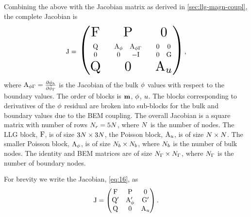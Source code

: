 \newcommand{\Amm}{\Am_\phim}
\newcommand{\Amu}{\Am_\phione}
\newcommand{\zm}{0}
\newcommand{\Abound}{\Am_{\phim\boundd}}

\newcommand{\scalemath}[2]{\scalebox{#1}{\begin{math} {#2} \end{math}}}

\newcommand{\Aprime}{\scalemath{0.5}{\begin{matrix} \Amm     & \Abound \\ \zm      & -\Idm \end{matrix}}}
\newcommand{\Gprime}{\scalemath{0.5}{\begin{matrix} \zm  & \zm \\ \zm  & \bm \end{matrix}}}
\newcommand{\Qprime}{\scalemath{0.5}{\begin{matrix} \Qm \\ \zm \end{matrix}}}


Combining the above with the Jacobian matrix as derived in \cref{sec:llg-magn-coupl}, the complete Jacobian is
\begin{equation}
  \Jm =
  \scalemath{2}{
    \begin{pmatrix}
      \Fm        & \Pm     &  \zm \\
      \Qprime &   \Aprime &  \Gprime  \\
      \Qm       &  \zm       &   \Amu
    \end{pmatrix}
  },
  \label{eq:16}
\end{equation}
where $\Abound = \pd{\phimh}{\phimdis_\boundd}$ is the Jacobian of the bulk $\phi$ values with respect to the boundary values.
The order of blocks is $\boldsymbol{\mathrm{m}}$, $\phi$, $u$.
The blocks corresponding to derivatives of the $\phi$ residual are broken into sub-blocks for the bulk and boundary values due to the BEM coupling.
The overall Jacobian is a square matrix with number of rows $N_r = 5N$, where $N$ is the number of nodes.
The LLG block, $\mathrm{F}$, is of size $3N\times 3N$, the Poisson block, $\Amu$, is of size $N \times N$.
The smaller Poisson block, $\Amm$, is of size $N_b \times N_b$, where $N_b$ is the number of bulk nodes.
The identity and BEM matrices are of size $N_{\Gamma} \times N_{\Gamma}$, where $N_{\Gamma}$ is the number of boundary nodes.

For brevity we write the Jacobian, \cref{eq:16}, as
\begin{equation}
  \Jm =
  \begin{pmatrix}
    \Fm       & \Pm     &  \zm \\
    \Qm' &   \Amm' &  \Gm'  \\
    \Qm       &  \zm       &   \Amu
  \end{pmatrix}.
\end{equation}



